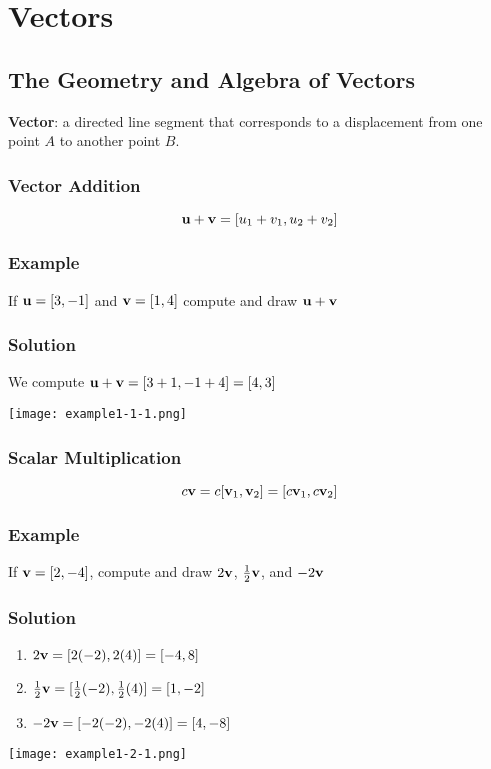 \setcounter{chapter}{0}
\chapter{Vectors}

\section{The Geometry and Algebra of Vectors}

\textbf{Vector}: a directed line segment that corresponds to a displacement from
one point $A$ to another point $B$.

\subsection*{Vector Addition}
$$\mathbf{u+v}=[u_1+v_1, u_2+v_2]$$

\subsection*{Example}
If $\mathbf{u}=[3,-1]$ and $\mathbf{v}=[1,4]$ compute and draw $\mathbf{u+v}$

\subsection*{Solution}
We compute $\mathbf{u + v} = [3+1, -1+4] = [4,3]$
\begin{center}
    \texttt{[image: example1-1-1.png]}
\end{center}

\subsection*{Scalar Multiplication}
$$c\mathbf{v}=c[\mathbf{v}_1,\mathbf{v}_2]=[c\mathbf{v}_1, c\mathbf{v}_2]$$

\subsection*{Example}
If $\mathbf{v} = [2,-4]$, compute and draw $2\mathbf{v}$, $\frac{1}{2}\mathbf{v}$, and $-2\mathbf{v}$

\subsection*{Solution}
\begin{enumerate}
    \item[] $2\mathbf{v} = [2(-2),2(4)] = [-4,8]$
    \item[] $\frac{1}{2}\mathbf{v} = [\frac{1}{2}(-2),\frac{1}{2}(4)] = [1,-2]$
    \item[] $-2\mathbf{v} = [-2(-2),-2(4)] = [4,-8]$
\end{enumerate}
\begin{center}
    \texttt{[image: example1-2-1.png]}
\end{center}

